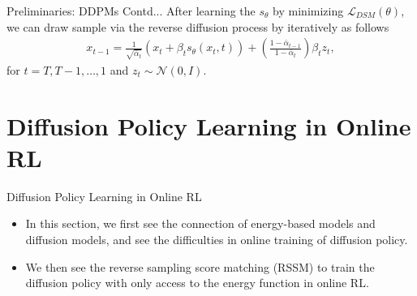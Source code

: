 \documentclass[aspectratio=169,xcolor=dvipsnames]{beamer}
\newcommand{\cL}{\mathcal{L}}
\newcommand{\te}{\theta}
\newcommand{\al}[1]{\begin{align}#1\end{align}}
\newcommand{\cN}{\mathcal{N}}
\begin{document}
\begin{frame}{Preliminaries: DDPMs Contd...}
After learning the $s_{\te}$ by minimizing $\cL_{DSM}(\te)$, we can draw sample via the reverse diffusion process by iteratively as follows
\al{
    x_{t-1} = \frac{1}{\sqrt{\bar{\alpha}_t}}(x_t+\beta_t s_{\te}(x_t,t)) + \left(\frac{1-\bar{\alpha}_{t-1}}{1-\bar{\alpha}_{t}}\right) \beta_t z_t, \label{eq:6}
}
for $t=T,T-1,\ldots,1$ and $z_t\sim \cN(0,I)$.
\end{frame}

\section{Diffusion Policy Learning in Online RL}
\begin{frame}{Diffusion Policy Learning in Online RL \cite{ma2025soft}}
\begin{itemize}
    \item  In this section, we first see the connection of energy-based models and diffusion models, and see the difficulties in online training of diffusion policy. 
 \item We then see the reverse sampling score matching (RSSM) to train the diffusion policy with only access to the energy function in online RL.
\end{itemize}
\end{frame}
\end{document}
